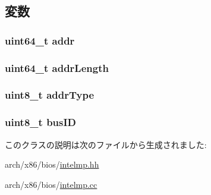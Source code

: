 \subsection{変数}
\hypertarget{classX86ISA_1_1IntelMP_1_1AddrSpaceMapping_a0e89cf6b9f6cd3125470b1bed2b823df}{
\subsubsection[{addr}]{\setlength{\rightskip}{0pt plus 5cm}uint64\_\-t {\bf addr}}}
\label{classX86ISA_1_1IntelMP_1_1AddrSpaceMapping_a0e89cf6b9f6cd3125470b1bed2b823df}
\hypertarget{classX86ISA_1_1IntelMP_1_1AddrSpaceMapping_a97f4838e0af1607eeaa66fbe722a9b5f}{
\subsubsection[{addrLength}]{\setlength{\rightskip}{0pt plus 5cm}uint64\_\-t {\bf addrLength}}}
\label{classX86ISA_1_1IntelMP_1_1AddrSpaceMapping_a97f4838e0af1607eeaa66fbe722a9b5f}
\hypertarget{classX86ISA_1_1IntelMP_1_1AddrSpaceMapping_a9f34509b1c4a58ce6c6ab2f748cc4c36}{
\subsubsection[{addrType}]{\setlength{\rightskip}{0pt plus 5cm}uint8\_\-t {\bf addrType}}}
\label{classX86ISA_1_1IntelMP_1_1AddrSpaceMapping_a9f34509b1c4a58ce6c6ab2f748cc4c36}
\hypertarget{classX86ISA_1_1IntelMP_1_1AddrSpaceMapping_ac86b1934f811ad40b20b27d29c52a5d3}{
\subsubsection[{busID}]{\setlength{\rightskip}{0pt plus 5cm}uint8\_\-t {\bf busID}}}
\label{classX86ISA_1_1IntelMP_1_1AddrSpaceMapping_ac86b1934f811ad40b20b27d29c52a5d3}


このクラスの説明は次のファイルから生成されました:\begin{DoxyCompactItemize}
\item 
arch/x86/bios/\hyperlink{intelmp_8hh}{intelmp.hh}\item 
arch/x86/bios/\hyperlink{intelmp_8cc}{intelmp.cc}\end{DoxyCompactItemize}
